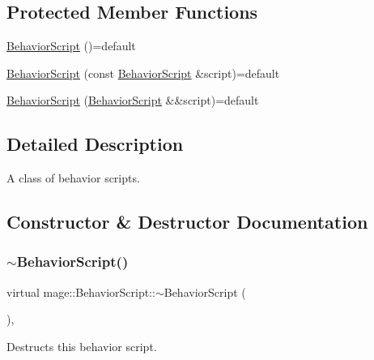 \subsection*{Protected Member Functions}
\begin{DoxyCompactItemize}
\item 
\hyperlink{classmage_1_1_behavior_script_a90ac6d3397f54ad95a931c9ef2c47549}{Behavior\+Script} ()=default
\item 
\hyperlink{classmage_1_1_behavior_script_ad5f522280746f2834b8962d25e66b19e}{Behavior\+Script} (const \hyperlink{classmage_1_1_behavior_script}{Behavior\+Script} \&script)=default
\item 
\hyperlink{classmage_1_1_behavior_script_acaa526b9c530951df4bfea531242c05b}{Behavior\+Script} (\hyperlink{classmage_1_1_behavior_script}{Behavior\+Script} \&\&script)=default
\end{DoxyCompactItemize}


\subsection{Detailed Description}
A class of behavior scripts. 

\subsection{Constructor \& Destructor Documentation}
\hypertarget{classmage_1_1_behavior_script_ac0aec6b7d3c0f3d009a1b4bd84295775}{}\label{classmage_1_1_behavior_script_ac0aec6b7d3c0f3d009a1b4bd84295775} 
\subsubsection{\texorpdfstring{$\sim$\+Behavior\+Script()}{~BehaviorScript()}}
{\footnotesize\ttfamily virtual mage\+::\+Behavior\+Script\+::$\sim$\+Behavior\+Script (\begin{DoxyParamCaption}{ }\end{DoxyParamCaption})\hspace{0.3cm}{\ttfamily [virtual]}, {\ttfamily [default]}}

Destructs this behavior script. \hypertarget{classmage_1_1_behavior_script_a90ac6d3397f54ad95a931c9ef2c47549}{}\label{classmage_1_1_behavior_script_a90ac6d3397f54ad95a931c9ef2c47549} 
